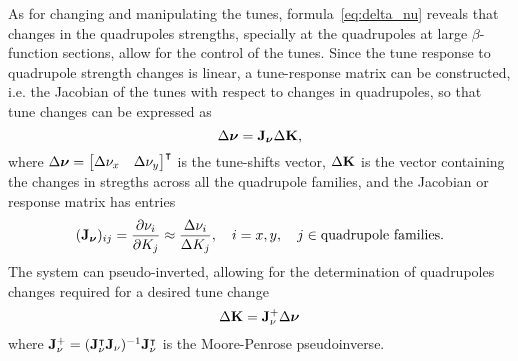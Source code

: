 As for changing and manipulating the tunes, formula~\eqref{eq:delta_nu} reveals that changes in the quadrupoles strengths, specially at the quadrupoles at large $\beta$-function sections, allow for the control of the tunes.  Since the tune response to quadrupole strength changes is linear, a tune-response matrix can be constructed, i.e. the Jacobian of the tunes with respect to changes in quadrupoles, so that tune changes can be expressed as
\begin{equation}
    \Delta\boldsymbol{\nu} = \vb{J}_{\boldsymbol{\nu}}\Delta \vb{K},
\end{equation}
where $\Delta\boldsymbol{\nu} = \mqty*[\Delta \nu_x & \Delta \nu_y]^\intercal$ is the tune-shifts vector, $\Delta \vb{K}$ is the vector containing the changes in stregths across all the quadrupole families, and the Jacobian or response matrix has entries
\begin{equation}
    (\vb{J}_{\boldsymbol{\nu}})_{ij} = \pdv{\nu_{i}}{K_j} \approx \frac{\Delta \nu_{i}}{\Delta K_j}, \quad i=x, y,\quad j\in\text{quadrupole families}.
\end{equation}
The system can pseudo-inverted, allowing for the determination of quadrupoles changes required for a desired tune change
\begin{equation}
    \Delta \vb{K} = \vb{J}_{\nu}^{+}\Delta \boldsymbol{\nu}
\end{equation}
where $\vb{J}_{\nu}^{+} = (\vb{J}_{\nu}^{\intercal}\vb{J}_{\nu})^{-1}\vb{J}_{\nu}^{\intercal}$ is the Moore-Penrose pseudoinverse.
